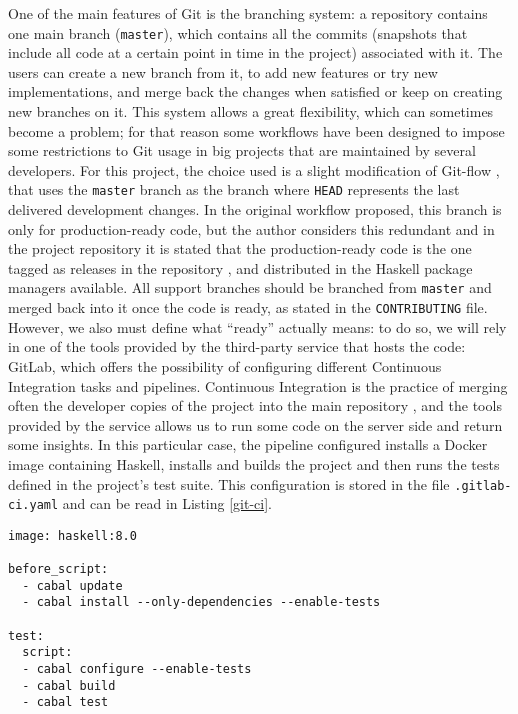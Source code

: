 One of the main features of Git is the branching system: a repository contains
one main branch (\texttt{master}), which contains all the commits (snapshots
that include all code at a certain point in time in the project) associated
with it. The users can create a new branch from it, to add new features or try
new implementations, and merge back the changes when satisfied or keep on
creating new branches on it. This system allows a great flexibility, which can
sometimes become a problem; for that reason some workflows have been designed
to impose some restrictions to Git usage in big projects that are maintained by
several developers. For this project, the choice used is a slight modification
of Git-flow \cite{driessen-2010-gitflow}, that uses the \texttt{master} branch
as the branch where \texttt{HEAD} represents the last delivered development
changes. In the original workflow proposed, this branch is only for
production-ready code, but the author considers this redundant and in the
project repository it is stated that the production-ready code is the one
tagged as releases in the repository \cite{chacon-2009-git}, and distributed in
the Haskell package managers available. All support branches should be branched
from \texttt{master} and merged back into it once the code is ready, as stated
in the \texttt{CONTRIBUTING} file.\\

However, we also must define what ``ready'' actually means: to do so, we will
rely in one of the tools provided by the third-party service that hosts the
code: GitLab, which offers the possibility of configuring different Continuous
Integration tasks and pipelines. Continuous Integration is the practice of
merging often the developer copies of the project into the main repository
\cite{fowler-2006-ci}, and the tools provided by the service allows us to run
some code on the server side and return some insights. In this particular case,
the pipeline configured installs a Docker image containing Haskell, installs
and builds the project and then runs the tests defined in the project's test
suite. This configuration is stored in the file \texttt{.gitlab-ci.yaml} and
can be read in Listing \ref{git-ci}.\\

\begin{lstlisting}[label=git-ci,
caption=Continuous Integration pipeline configuration]
image: haskell:8.0

before_script:
  - cabal update
  - cabal install --only-dependencies --enable-tests

test:
  script:
  - cabal configure --enable-tests
  - cabal build
  - cabal test
\end{lstlisting}

